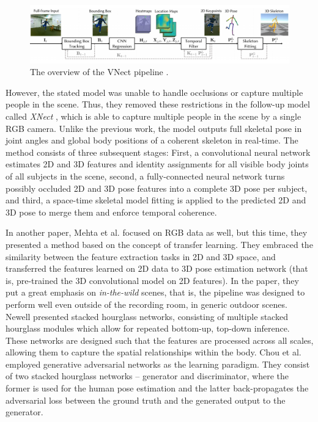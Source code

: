 \vspace{5mm}
\begin{figure}[H]
\begin{center}
  \includegraphics[width=\textwidth]{images/related_work/VNect.PNG}
  \caption{The overview of the VNect pipeline \cite{VNect_SIGGRAPH2017}.}
  \label{fig:Vnect}
\end{center}
\end{figure}

\noindent However, the stated model was unable to handle occlusions or capture multiple people in the scene. Thus, they removed these restrictions in the follow-up model called \textit{XNect} \cite{DBLP:journals/corr/abs-1907-00837}, which is able to capture multiple people in the scene by a single RGB camera. Unlike the previous work, the model outputs full skeletal pose in joint angles and global body positions of a coherent skeleton in real-time. The method consists of three subsequent stages: First, a convolutional neural network estimates 2D and 3D features and identity assignments for all visible body joints of all subjects in the scene, second, a fully-connected neural network turns possibly occluded 2D and 3D pose features into a complete 3D pose per subject, and third, a space-time skeletal model fitting is applied to the predicted 2D and 3D pose to merge them and enforce temporal coherence.\par
\vspace{5mm}
\noindent
In another paper, Mehta et al. \cite{mono-3dhp2017} focused on RGB data as well, but this time, they presented a method based on the concept of transfer learning. They embraced the similarity between the feature extraction tasks in 2D and 3D space, and transferred the features learned on 2D data to 3D pose estimation network (that is, pre-trained the 3D convolutional model on 2D features). In the paper, they put a great emphasis on \textit{in-the-wild} scenes, that is, the pipeline was designed to perform well even outside of the recording room, in generic outdoor scenes. Newell \cite{DBLP:journals/corr/NewellYD16} presented stacked hourglass networks, consisting of multiple stacked hourglass modules which allow for repeated bottom-up, top-down inference. These networks are designed such that the features are processed across all scales, allowing them to capture the spatial relationships within the body. Chou et al. \cite{DBLP:journals/corr/ChouCC17} employed generative adversarial networks as the learning paradigm. They consist of two stacked hourglass networks – generator and discriminator, where the former is used for the human pose estimation and the latter back-propagates the adversarial loss between the ground truth and the generated output to the generator. \par
